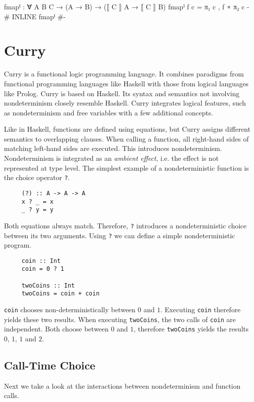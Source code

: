 \begin{code}
fmapᴵ : ∀ {A B C} → (A → B) → (⟦ C ⟧ A → ⟦ C ⟧ B)
fmapᴵ f c = π₁ c , f ∘ π₂ c
{-# INLINE fmapᴵ #-}
\end{code}


\section{Curry}
\label{preliminaries:curry}

Curry \cite{Hanus95curry} is a functional logic programming language.
It combines paradigms from functional programming languages like Haskell
with those from logical languages like Prolog.
Curry is based on Haskell.
Its syntax and semantics not involving nondeterminism closely resemble Haskell.
Curry integrates logical features, such as nondeterminism and free variables
with a few additional concepts.

Like in Haskell, functions are defined using equations, but Curry assigns
different semantics to overlapping clauses.
When calling a function, all right-hand sides of matching left-hand sides are
executed.
This introduces nondeterminism.
Nondeterminism is integrated as an \textit{ambient effect}, i.e. the effect is
not represented at type level.
The simplest example of a nondeterministic function is the choice operator
\texttt{?}.

\begin{verbatim}
     (?) :: A -> A -> A
     x ? _ = x
     _ ? y = y
\end{verbatim}
Both equations always match.
Therefore, \texttt{?} introduces a nondeterministic choice between its two
arguments.
Using \texttt{?} we can define a simple nondeterministic program.

\begin{verbatim}
     coin :: Int
     coin = 0 ? 1

     twoCoins :: Int
     twoCoins = coin + coin
\end{verbatim}
\texttt{coin} chooses non-deterministically between $0$ and $1$.
Executing \texttt{coin} therefore yields these two results.
When executing \texttt{twoCoins}, the two calls of \texttt{coin} are independent.
Both choose between $0$ and $1$, therefore \texttt{twoCoins} yields the results
$0$, $1$, $1$ and $2$.

\subsection{Call-Time Choice}
\label{call-time-choice}
Next we take a look at the interactions between nondeterminism and function
calls.

